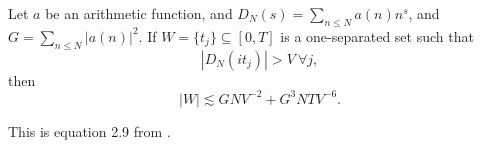 \fi
\begin{lemma}
    \label{halasz}
    Let $a$ be an arithmetic function, and $D_N(s)=\sum_{n\leq N}a(n)n^{s}$, and $G=\sum_{n\leq N} |a(n)|^2.$
    If $W = \{t_j\}\subseteq [0,T]$ is a one-separated set such that \[
        |D_N(it_j)| > V \ \forall j,
    \]
    then 
    \[
        |W|\lesssim GNV^{-2} + G^3NTV^{-6}.
        \]
\end{lemma}
This is equation 2.9 from \cite{Huxley1971}.
\iffalse
\begin{proof}
    Let $-\theta_j$ be the argument of $D(it_j)$, then we have \begin{align*}
        V|W|\leq \sum_j |D(it_j)| = \sum_j e^{\theta_j}D(it_j ) = \sum_{n\leq N} \sum_j e^{i\theta_j} a(n) n^{-it_j}.
    \end{align*}
    By Cauchy-Schwarz, this summation is \[
    \leq \left(\sum_{n\leq N} |a(n)|^2 \right)^{1/2}\left(\sum_{n\leq N} \bigg|\sum_j e^{i\theta_j} n^{-it_j}\bigg|^2 \right)^{1/2}.
    \]
    The first summation in this expression is $G$, so we want to bound the latter nested summation.
    Expanding the summation gives \begin{align*}
        \sum_{n\leq N} \bigg|\sum_j e^{i\theta_j} n^{-it_j}\bigg|^2 =& 
        \sum_{n\leq N} \sum_{j_1,j_2} e^{i\theta_{j_1}-i\theta_{j_2}} n^{it_{j_1}-it_{j_2}}\\
        \leq & |W|N + \sum_{j_1,j_2} \bigg|\sum_{n\leq N}  n^{it_{j_1}-it_{j_2}}\bigg|.
    \end{align*}
    \textcolor{red}{TODO}
\end{proof}
\fi
